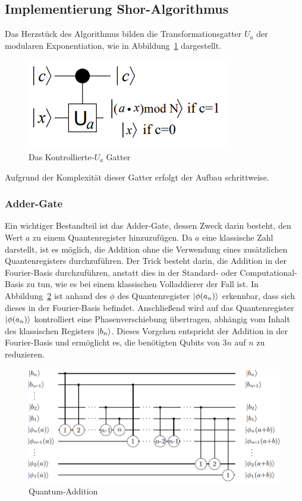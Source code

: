 \documentclass[
  a4paper, %
  10pt, %
  unnumberedsections, %
  twoside, %
]{LTJournalArticle}
\begin{document}
\subsection{Implementierung Shor-Algorithmus}
Das Herzstück des Algorithmus bilden die Transformationsgatter \(U_a\) der modularen Exponentiation,
wie in Abbildung~\ref{fig:c-Ugate} dargestellt.
\begin{figure}[h]
\caption{Das Kontrollierte-\(U_a\) Gatter~\autocite{beauregard2003circuit}}
\label{fig:c-Ugate}
\includegraphics[scale=0.8]{c-Ugate.PNG}
\centering
\end{figure}
Aufgrund der Komplexität dieser Gatter erfolgt der Aufbau schrittweise.
\subsubsection{Adder-Gate}
Ein wichtiger Bestandteil ist das Adder-Gate, dessen Zweck darin besteht,
den Wert \(a\) zu einem Quantenregister hinzuzufügen.
Da \(a\) eine klassische Zahl darstellt, ist es möglich,
die Addition ohne die Verwendung eines zusätzlichen Quantenregisters durchzuführen.
Der Trick besteht darin, die Addition in der Fourier-Basis durchzuführen,
anstatt dies in der Standard- oder Computational-Basis zu tun,
wie es bei einem klassischen Volladdierer der Fall ist.
In Abbildung~\ref{fig:Quantum-Addition} ist anhand des \(\phi\) des Quantenregister \(\ket{\phi(a_n)}\) erkennbar,
dass sich dieses in der Fourier-Basis befindet.
Anschließend wird auf das Quantenregister \(\ket{\phi(a_n)}\) kontrolliert eine Phasenverschiebung übertragen,
abhängig vom Inhalt des klassischen Registers \(\ket{b_n}\).
Dieses Vorgehen entspricht der Addition in der Fourier-Basis und ermöglicht es,
die benötigten Qubits von \(3n\) auf \(n\) zu reduzieren.
\begin{figure}[h]
\caption{Quantum-Addition~\autocite{draper2000addition}}
\label{fig:Quantum-Addition}
\includegraphics[scale=0.4]{Quantum-Addition.PNG}
\centering
\end{figure}
\end{document}
